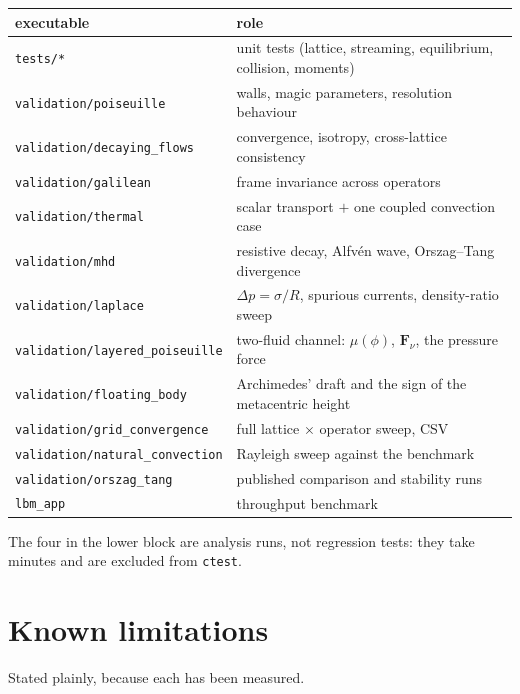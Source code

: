 \documentclass[11pt,a4paper]{article}
\newcommand{\code}[1]{\texttt{\small #1}}
\begin{document}
\begin{center}\small
\begin{tabular}{ll}
\toprule
executable & role \\
\midrule
\code{tests/*}                    & unit tests (lattice, streaming, equilibrium, collision, moments) \\
\code{validation/poiseuille}      & walls, magic parameters, resolution behaviour \\
\code{validation/decaying\_flows} & convergence, isotropy, cross-lattice consistency \\
\code{validation/galilean}        & frame invariance across operators \\
\code{validation/thermal}         & scalar transport $+$ one coupled convection case \\
\code{validation/mhd}             & resistive decay, Alfv\'en wave, Orszag--Tang divergence \\
\code{validation/laplace}         & $\Delta p = \sigma/R$, spurious currents, density-ratio sweep \\
\code{validation/layered\_poiseuille} & two-fluid channel: $\mu(\phi)$, $\bm{F}_\nu$, the pressure force \\
\code{validation/floating\_body}  & Archimedes' draft and the sign of the metacentric height \\
\midrule
\code{validation/grid\_convergence}   & full lattice $\times$ operator sweep, CSV \\
\code{validation/natural\_convection} & Rayleigh sweep against the benchmark \\
\code{validation/orszag\_tang}        & published comparison and stability runs \\
\code{lbm\_app}                       & throughput benchmark \\
\bottomrule
\end{tabular}
\end{center}

\noindent The four in the lower block are analysis runs, not regression tests:
they take minutes and are excluded from \code{ctest}.

\section{Known limitations}
\label{sec:known}

Stated plainly, because each has been measured.
\end{document}
